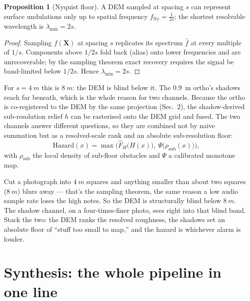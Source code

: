 \documentclass[11pt]{article}
\theoremstyle{definition}
\newtheorem{proposition}{Proposition}[section]
\begin{document}
\begin{proposition}[Nyquist floor]
A DEM sampled at spacing $s$ can represent surface undulations only up to spatial
frequency $f_{\mathrm{Ny}}=\tfrac{1}{2s}$; the shortest resolvable wavelength is
$\lambda_{\min}=2s$.
\end{proposition}
\begin{proof}
Sampling $f(\mathbf X)$ at spacing $s$ replicates its spectrum $\hat f$ at every
multiple of $1/s$. Components above $1/2s$ fold back (alias) onto lower frequencies
and are unrecoverable; by the sampling theorem exact recovery requires the signal be
band-limited below $1/2s$. Hence $\lambda_{\min}=2s$.
\end{proof}
For $s=\SI{4}{m}$ this is $\SI{8}{m}$: the DEM is blind below it. The
\SI{0.9}{m} ortho's shadows reach far beneath, which is the whole reason for two
channels. Because the ortho is co-registered to the DEM by the same projection
(Sec.~2), the shadow-derived sub-resolution relief $h$ can be rasterised onto the DEM
grid and fused. The two channels answer different questions, so they are combined not
by naive summation but as a resolved-scale rank and an absolute sub-resolution floor:
\begin{equation}
\text{Hazard}(x)=\max\Big(\widehat F_H\!\big(H(x)\big),\ \Psi\big(\rho_{\text{sub}}(x)\big)\Big),
\end{equation}
with $\rho_{\text{sub}}$ the local density of sub-floor obstacles and $\Psi$ a calibrated
monotone map.

\begin{words}
Cut a photograph into $\SI{4}{m}$ squares and anything smaller than about two squares
($\SI{8}{m}$) blurs away --- that's the sampling theorem, the same reason a low
audio sample rate loses the high notes. So the DEM is structurally blind below
$\SI{8}{m}$. The shadow channel, on a four-times-finer photo, sees right into that
blind band. Stack the two: the DEM ranks the resolved roughness, the shadows set an
absolute floor of ``stuff too small to map,'' and the hazard is whichever alarm is
louder.
\end{words}

\section{Synthesis: the whole pipeline in one line}
\end{document}
